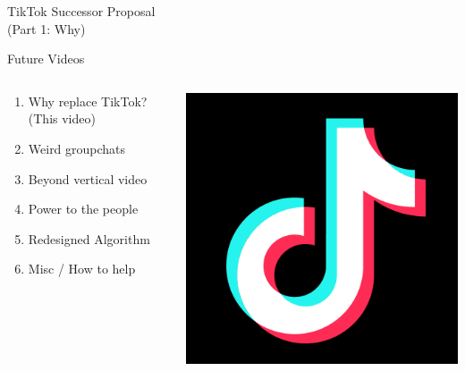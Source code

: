 \documentclass[aspectratio=169]{beamer}
\begin{document}
\begin{frame}
    \centering
    \Huge TikTok Successor Proposal \\
    \Huge (Part 1: Why)
\end{frame}

\begin{frame}{Future Videos}
\begin{columns}[T]
    \begin{column}[T]{0.5\textwidth}
        \begin{enumerate}
            \item Why replace TikTok? (This video)
            \item Weird groupchats 
            \item Beyond vertical video
            \item Power to the people
            \item Redesigned Algorithm
            \item Misc / How to help
        \end{enumerate}
    \end{column}
    \begin{column}{0.5\textwidth}
        \includegraphics[height=0.8\textheight]{imgs/app_icons/tiktok-icon2.png}
    \end{column}
\end{columns}
\end{frame}
\end{document}
